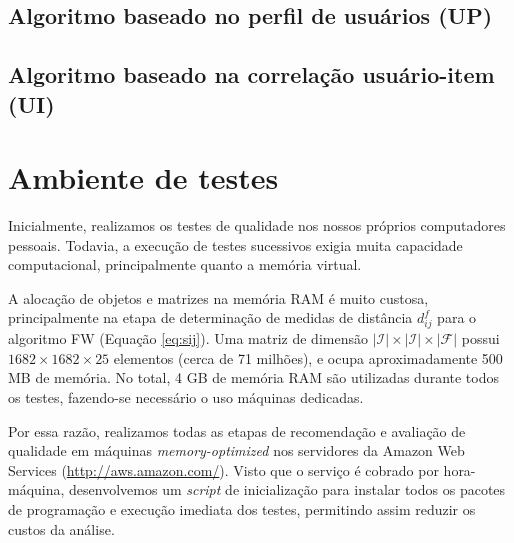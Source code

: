 



\subsection{Algoritmo baseado no perfil de usuários (UP)} %
\label{sub:algoritmo_baseado_no_perfil_de_usu_rios_up_}
\subsection{Algoritmo baseado na correlação usuário-item (UI)} %
\label{sub:algoritmo_baseado_na_correla_o_usu_rio_item_ui_}




\section{Ambiente de testes} %
\label{sec:ambiente_de_testes}

Inicialmente, realizamos os testes de qualidade nos nossos próprios computadores pessoais. Todavia, a execução de testes sucessivos exigia muita capacidade computacional, principalmente quanto a memória virtual.

A alocação de objetos e matrizes na memória RAM é muito custosa, principalmente na etapa de determinação de medidas de distância $d_{ij}^f$ para o algoritmo FW (Equação \ref{eq:sij}). Uma matriz de dimensão $\left|\mathcal{I}\right| \times\left|\mathcal{I}\right| \times\left|\mathcal{F}\right|$ possui $1682 \times 1682 \times 25$ elementos (cerca de 71 milhões), e ocupa aproximadamente 500 MB de memória. No total, 4 GB de memória RAM são utilizadas durante todos os testes, fazendo-se necessário o uso máquinas dedicadas.

Por essa razão, realizamos todas as etapas de recomendação e avaliação de qualidade em máquinas \textit{memory-optimized} nos servidores da Amazon Web Services (\url{http://aws.amazon.com/}). Visto que o serviço é cobrado por hora-máquina, desenvolvemos um \textit{script} de inicialização para instalar todos os pacotes de programação e execução imediata dos testes, permitindo assim reduzir os custos da análise.   

